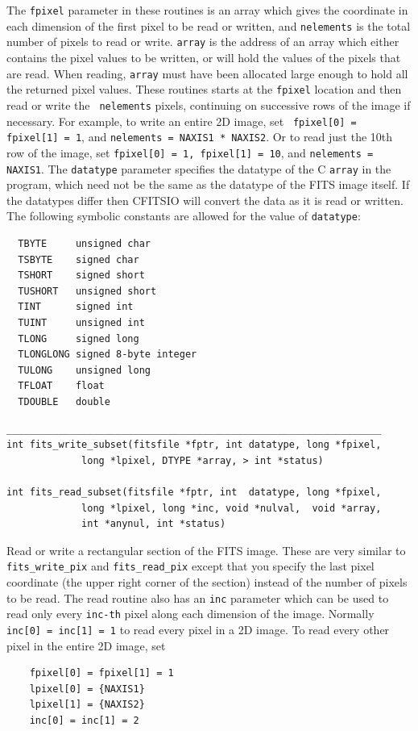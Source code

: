 \documentclass[11pt]{article}
\begin{document}
The {\tt fpixel} parameter in these routines is an array which gives
the coordinate in each dimension of the first pixel to be read or
written, and {\tt nelements} is the total number of pixels to read or
write.  {\tt array} is the address of an array which either contains
the pixel values to be written, or will hold the values of the pixels
that are read.  When reading, {\tt array} must have been allocated
large enough to hold all the returned pixel values.  These routines
starts at the {\tt fpixel} location and then read or write the {\tt
nelements} pixels, continuing on successive rows of the image if
necessary.  For example, to write an entire 2D image, set {\tt
fpixel[0] = fpixel[1] = 1}, and {\tt nelements = NAXIS1 * NAXIS2}.  Or
to read just the 10th row of the image, set {\tt fpixel[0] = 1,
fpixel[1] = 10}, and {\tt nelements = NAXIS1}.  The {\tt datatype}
parameter specifies the datatype of the C {\tt array} in the program,
which need not be the same as the datatype of the FITS image itself.
If the datatypes differ then CFITSIO will convert the data as it is
read or written.  The following symbolic constants are allowed for the
value of {\tt datatype}:
\begin{verbatim}
  TBYTE     unsigned char
  TSBYTE    signed char
  TSHORT    signed short
  TUSHORT   unsigned short
  TINT      signed int
  TUINT     unsigned int
  TLONG     signed long
  TLONGLONG signed 8-byte integer
  TULONG    unsigned long
  TFLOAT    float
  TDOUBLE   double
\end{verbatim}


\begin{verbatim}
_________________________________________________________________
int fits_write_subset(fitsfile *fptr, int datatype, long *fpixel,
             long *lpixel, DTYPE *array, > int *status)

int fits_read_subset(fitsfile *fptr, int  datatype, long *fpixel,
             long *lpixel, long *inc, void *nulval,  void *array,
             int *anynul, int *status)
\end{verbatim}

Read or write a rectangular section of the FITS image.  These are very
similar to {\tt fits\_write\_pix} and {\tt fits\_read\_pix} except that
you specify the last pixel coordinate (the upper right corner of the
section) instead of the number of pixels to be read.  The read routine
also has an {\tt inc} parameter which can be used to read only every
{\tt inc-th} pixel along each dimension of the image.  Normally  {\tt
inc[0] = inc[1] = 1} to read every pixel in a 2D image.  To read every
other pixel in the entire 2D image, set
\begin{verbatim}
    fpixel[0] = fpixel[1] = 1
    lpixel[0] = {NAXIS1}
    lpixel[1] = {NAXIS2}
    inc[0] = inc[1] = 2
\end{verbatim}
\end{document}
